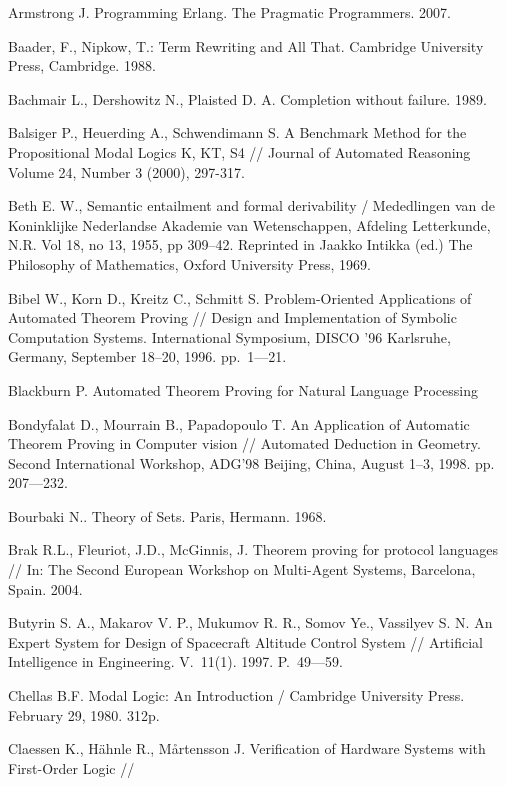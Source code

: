 \begin{thebibliography}{99}
 Armstrong J. Programming Erlang. The Pragmatic Programmers. 2007.

 Baader, F., Nipkow, T.: Term Rewriting and All That. Cambridge University Press, Cambridge. 1988.

 Bachmair L., Dershowitz N., Plaisted D. A. Completion without failure. 1989.

 Balsiger P., Heuerding A., Schwendimann S. A Benchmark Method for the Propositional Modal Logics K, KT, S4 // Journal of Automated Reasoning Volume 24, Number 3 (2000), 297-317.

 Beth E. W., Semantic entailment and formal derivability / Mededlingen van de Koninklijke Nederlandse Akademie van Wetenschappen, Afdeling Letterkunde, N.R. Vol 18, no 13, 1955, pp 309–42. Reprinted in Jaakko Intikka (ed.) The Philosophy of Mathematics, Oxford University Press, 1969. 


 Bibel W., Korn D., Kreitz C., Schmitt S. Problem-Oriented Applications of Automated Theorem Proving // Design and Implementation of Symbolic Computation Systems. International Symposium, DISCO '96 Karlsruhe, Germany, September 18–20, 1996. pp.~1---21.

 Blackburn P. Automated Theorem Proving for Natural Language Processing

 Bondyfalat D., Mourrain B., Papadopoulo T. An Application of Automatic Theorem Proving in Computer vision // Automated Deduction in Geometry. Second International Workshop, ADG’98 Beijing, China, August 1–3, 1998. pp. 207---232.

 Bourbaki N.. Theory of Sets. Paris, Hermann. 1968.

 Brak R.L., Fleuriot, J.D., McGinnis, J. Theorem proving for protocol languages // In: The Second European Workshop on Multi-Agent Systems, Barcelona, Spain. 2004.

 Butyrin S. A., Makarov V. P., Mukumov R. R., Somov Ye., Vassilyev S. N. An {E}xpert {S}ystem for {D}esign of {S}pacecraft  {A}ltitude {C}ontrol {S}ystem // Artificial Intelligence in Engineering. V.~11(1). 1997. P.~49---59.

 Chellas B.F. Modal Logic: An Introduction / Cambridge University Press. February 29, 1980. 312p.

 Claessen K., Hähnle R., Mårtensson J. Verification of Hardware Systems with First-Order Logic // 


\end{thebibliography}
